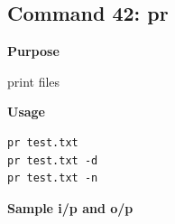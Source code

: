 \documentclass{article}
\begin{document}
\subsection{Command 42: pr} 
\textbf{Purpose}
\begin{flushleft}
 print files
\end{flushleft}
\textbf{Usage}
\begin{verbatim}
pr test.txt
pr test.txt -d
pr test.txt -n
\end{verbatim}
\textbf{Sample i/p and o/p}
\begin{figure}[H] 
\end{figure}
\end{document}

